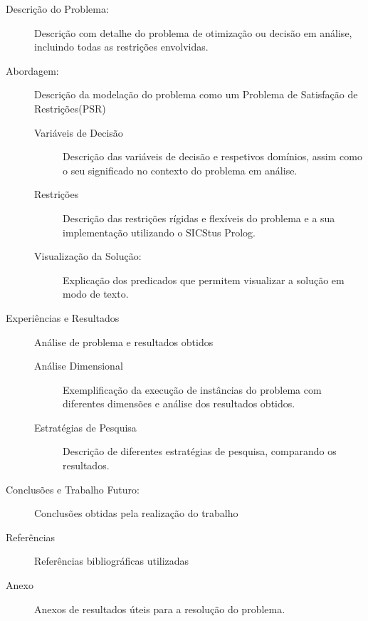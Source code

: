 \documentclass[11pt]{article}
\begin{document}
\begin{description}

\item[Descrição do Problema:] Descrição com detalhe do problema de
otimização ou decisão em análise, incluindo todas as restrições envolvidas.

\item[Abordagem:] Descrição da modelação do problema como um Problema de Satisfação de Restrições(PSR)

\begin{description}

\item[Variáveis de Decisão] Descrição das variáveis de decisão e
respetivos domínios, assim como o seu significado no contexto do problema em análise.

\item[Restrições] Descrição das restrições rígidas e flexíveis do problema e a
sua implementação utilizando o SICStus Prolog.

\item[Visualização da Solução:] Explicação dos predicados que permitem
visualizar a solução em modo de texto.

\end{description}


\item[Experiências e Resultados] Análise de problema e resultados obtidos

\begin{description}

\item[Análise Dimensional] Exemplificação da execução de instâncias do problema com
diferentes dimensões e análise dos resultados obtidos.

\item[Estratégias de Pesquisa] Descrição de diferentes estratégias de pesquisa, comparando os resultados.

\end{description}


\item[Conclusões e Trabalho Futuro:] Conclusões obtidas pela realização do trabalho

\item[Referências] Referências bibliográficas utilizadas

\item[Anexo] Anexos de resultados úteis para a resolução do problema.

\end{description}
\end{document}
